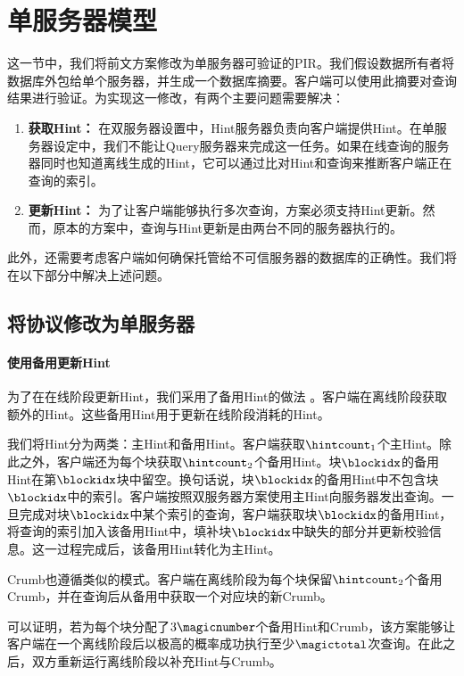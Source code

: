 \section{单服务器模型}
这一节中，我们将前文方案修改为单服务器可验证的PIR。我们假设数据所有者将数据库外包给单个服务器，并生成一个数据库摘要。客户端可以使用此摘要对查询结果进行验证。为实现这一修改，有两个主要问题需要解决：
\begin{enumerate}
    \item \textbf{获取Hint：} 在双服务器设置中，Hint服务器负责向客户端提供Hint。在单服务器设定中，我们不能让Query服务器来完成这一任务。如果在线查询的服务器同时也知道离线生成的Hint，它可以通过比对Hint和查询来推断客户端正在查询的索引。
    \item \textbf{更新Hint：} 为了让客户端能够执行多次查询，方案必须支持Hint更新。然而，原本的方案中，查询与Hint更新是由两台不同的服务器执行的。
\end{enumerate}

此外，还需要考虑客户端如何确保托管给不可信服务器的数据库的正确性。我们将在以下部分中解决上述问题。

\subsection{将协议修改为单服务器}

\paragraph{使用备用更新Hint}
为了在在线阶段更新Hint，我们采用了备用Hint的做法 \cite{EC:CorHenKog22}。客户端在离线阶段获取额外的Hint。这些备用Hint用于更新在线阶段消耗的Hint。

我们将Hint分为两类：主Hint和备用Hint。客户端获取$\hintcount_1$个主Hint。除此之外，客户端还为每个块获取$\hintcount_2$个备用Hint。块$\blockidx$的备用Hint在第$\blockidx$块中留空。换句话说，块$\blockidx$的备用Hint中不包含块$\blockidx$中的索引。客户端按照双服务器方案使用主Hint向服务器发出查询。一旦完成对块$\blockidx$中某个索引的查询，客户端获取块$\blockidx$的备用Hint，将查询的索引加入该备用Hint中，填补块$\blockidx$中缺失的部分并更新校验信息。这一过程完成后，该备用Hint转化为主Hint。

Crumb也遵循类似的模式。客户端在离线阶段为每个块保留$\hintcount_2$个备用Crumb，并在查询后从备用中获取一个对应块的新Crumb。

可以证明，若为每个块分配了$3\magicnumber$个备用Hint和Crumb，该方案能够让客户端在一个离线阶段后以极高的概率成功执行至少$\magictotal$次查询。在此之后，双方重新运行离线阶段以补充Hint与Crumb。

